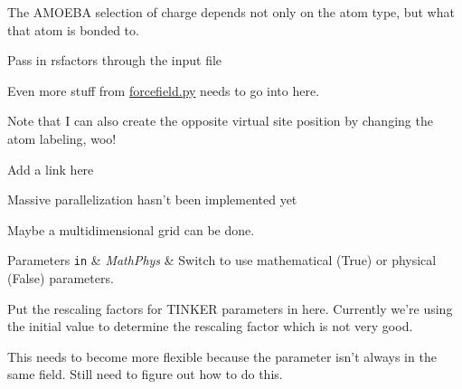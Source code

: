 \begin{DoxyRefList}
The A\-M\-O\-E\-B\-A selection of charge depends not only on the atom type, but what that atom is bonded to.  
\item[\label{todo__todo000007}%
\hypertarget{todo__todo000007}{}%
Member \hyperlink{classforcebalance_1_1forcefield_1_1FF_a88715f96ff8e14c3c83b4f976ad147b4}{forcebalance.forcefield.F\-F.rsmake} ]Pass in rsfactors through the input file 
\item[\label{todo__todo000009}%
\hypertarget{todo__todo000009}{}%
Namespace \hyperlink{namespaceforcebalance_1_1gmxio}{forcebalance.gmxio} ]Even more stuff from \hyperlink{forcefield_8py}{forcefield.\-py} needs to go into here. 
\item[\label{todo__todo000011}%
\hypertarget{todo__todo000011}{}%
Class \hyperlink{classforcebalance_1_1gmxio_1_1ITP__Reader}{forcebalance.gmxio.I\-T\-P\-\_\-\-Reader} ]Note that I can also create the opposite virtual site position by changing the atom labeling, woo! 
\item[\label{todo__todo000013}%
\hypertarget{todo__todo000013}{}%
Member \hyperlink{classforcebalance_1_1openmmio_1_1OpenMM__Reader_ac89322d09d53425b5151f39306f4b38b}{forcebalance.openmmio.Open\-M\-M\-\_\-\-Reader.build\-\_\-pid} ]Add a link here  
\item[\label{todo__todo000014}%
\hypertarget{todo__todo000014}{}%
Member \hyperlink{classforcebalance_1_1optimizer_1_1Optimizer_a50ffc779fbba5a99085cba45d868fc29}{forcebalance.optimizer.Optimizer.Genetic\-Algorithm} ]Massive parallelization hasn't been implemented yet 
\item[\label{todo__todo000015}%
\hypertarget{todo__todo000015}{}%
Member \hyperlink{classforcebalance_1_1optimizer_1_1Optimizer_a6c7508252398ff7e00469c4c8acb0a48}{forcebalance.optimizer.Optimizer.Scan\-\_\-\-Values} ]Maybe a multidimensional grid can be done. 
\begin{DoxyParams}[1]{Parameters}
\mbox{\tt in}  & {\em Math\-Phys} & Switch to use mathematical (True) or physical (False) parameters. \\
\hline
\end{DoxyParams}

\item[\label{todo__todo000017}%
\hypertarget{todo__todo000017}{}%
Member \hyperlink{classforcebalance_1_1tinkerio_1_1Tinker__Reader_a78df181e8a2ffea7054b1915e47384b7}{forcebalance.tinkerio.Tinker\-\_\-\-Reader.feed} ]Put the rescaling factors for T\-I\-N\-K\-E\-R parameters in here. Currently we're using the initial value to determine the rescaling factor which is not very good. 
\item[\label{todo__todo000010}%
\hypertarget{todo__todo000010}{}%
Member \hyperlink{namespaceforcebalance_1_1gmxio_ae845e0b923ecde16c79f2742b94534a6}{forcebalance\-:\-:gmxio.pdict} ]This needs to become more flexible because the parameter isn't always in the same field. Still need to figure out how to do this. 


\end{DoxyRefList}
